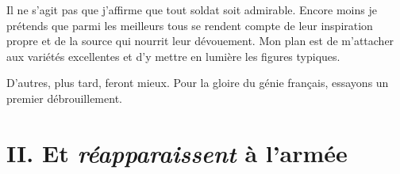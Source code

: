 \documentclass[french,twoside]{book} %
\newcommand\chapteropen{} %
\newcommand\chapterclose{} %
\begin{document}
Il ne s’agit pas que j’affirme que tout soldat soit admirable. Encore moins je prétends que parmi les meilleurs tous se rendent compte de leur inspiration propre et de la source qui nourrit leur dévouement. Mon plan est de m’attacher aux variétés excellentes et d’y mettre en lumière les figures typiques.‌\par
D’autres, plus tard, feront mieux. Pour la gloire du génie français, essayons un premier débrouillement.‌
\chapterclose


\chapteropen
\chapter[{II. Et réapparaissent à l’armée}]{II. Et {\itshape réapparaissent} à l’armée}\renewcommand{\leftmark}{II. Et {\itshape réapparaissent} à l’armée}
\end{document}
